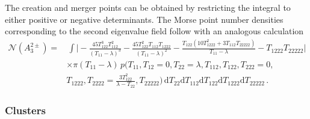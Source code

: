 \documentclass[a4paper, 11pt]{article}
\begin{document}
The creation and merger points can be obtained by restricting the integral to either positive or negative determinants. The Morse point number densities corresponding to the second eigenvalue field follow with an analogous calculation
\begin{align}
\mathcal{N}(A_3^{2\pm}) 
=&\, \int \bigg|
-\frac{45 T_{122}^3 T_{112}^2}{(T_{11}-\lambda)^3}
-\frac{45 T_{122}^2T_{112}T_{1222}}{(T_{11}-\lambda)^2}
-\frac{T_{122}(10T_{1222}^2 + 3 T_{112}T_{22222})}{T_{11}-\lambda}
-T_{1222}T_{22222}
\bigg| \nonumber\\
&\times \pi(T_{11}-\lambda)\,p(T_{11},T_{12}=0,T_{22}=\lambda,T_{112},T_{122},T_{222}=0,\nonumber\\
&T_{1222}, T_{2222}=\frac{3T_{122}^2}{\lambda-T_{22}},T_{22222})\, \mathrm{d}T_{22}\mathrm{d}T_{112}\mathrm{d}T_{122}\mathrm{d}T_{1222}\mathrm{d}T_{22222}\,.
\end{align}

\subsubsection{Clusters}
\end{document}
